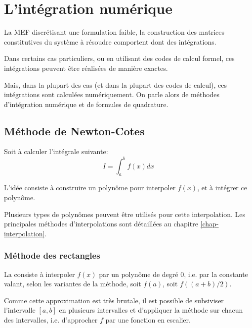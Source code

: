 \chapter{L'intégration numérique}\label{chap-quadrature}

La MEF discrétisant une formulation faible,  la construction des matrices 
constitutives du système à  résoudre comportent dont des intégrations.

Dans certains cas particuliers, ou en utilisant des codes de calcul formel, ces intégrations
peuvent être réalisées de manière exactes.

Mais, dans la plupart des cas (et dans la plupart des codes de calcul), ces
intégrations sont calculées numériquement. On parle alors de méthodes
d'intégration numérique et de formules de quadrature.






\medskip
\section{Méthode de Newton-Cotes}

Soit à calculer l'intégrale suivante:
\begin{equation}I=\int_a^b f(x)dx\end{equation}

\medskip
L'idée consiste à construire un polynôme pour interpoler $f(x)$, et
à intégrer ce polynôme.

\medskip
Plusieurs types de polynômes peuvent être utilisés pour cette interpolation.
Les principales méthodes d'interpolations sont détaillées au chapitre \ref{chap-interpolation}.



\medskip
\subsection*{Méthode des rectangles}

La  consiste à interpoler $f(x)$ par un
polynôme de degré $0$, i.e. par la constante valant, selon les variantes de la
méthode, soit $f(a)$, soit $f((a+b)/2)$.

\medskip
Comme cette approximation est très brutale, il est possible de subsiviser
l'intervalle $[a,b]$ en plusieurs intervalles et d'appliquer la méthode sur chacun
des intervalles, i.e. d'approcher $f$ par une fonction en escalier.


